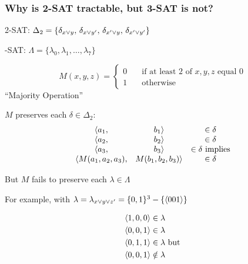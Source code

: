 \documentclass[12pt,xcolor=dvipsnames%
   ]{beamer}
\renewcommand{\.}{\cdot}
\begin{document}
\begin{frame}
\frametitle{Why is 2-SAT tractable, but 3-SAT is not?}

2-SAT: $\Delta_2=\{\delta_{x\vee y},\,\delta_{x\vee y'},\, \delta_{x'\vee y},\, \delta_{x'\vee y'}\} $

-SAT: $\Lambda=\{\lambda_0,\lambda_1,\dots, \lambda_7\}$

\pause
\begin{equation*}
M(x,y,z) = \begin{cases}
	0 \quad&\text{if at least 2 of $x,y,z$ equal 0}\\
	1 &\text{otherwise}
	\end{cases}
\end{equation*}
``Majority Operation''

\pause
$M$ preserves each $\delta\in \Delta_2$:
\begin{equation*}
\begin{matrix}
\langle a_1, &b_1\rangle &\in \delta\\
\langle a_2, &b_2\rangle &\in \delta\\
\langle a_3, &b_3\rangle &\in \delta \text{ implies}\\
\langle M(a_1,a_2,a_3), &M(b_1,b_2,b_3)\rangle &\in \delta
\end{matrix}
\end{equation*}

\end{frame}

\begin{frame}
But $M$ fails to preserve each $\lambda\in \Lambda$

\medskip
For example, with $\lambda=\lambda_{x\vee y\vee z'}=\{0,1\}^3-\{\langle001\rangle\}$ 

\begin{align*}
\langle1,0,0\rangle &\in \lambda\\
\langle0,0,1\rangle &\in \lambda\\
\langle0,1,1\rangle &\in \lambda \text{ but}\\
\langle0,0,1\rangle &\notin \lambda
\end{align*}

\end{frame}
\end{document}
